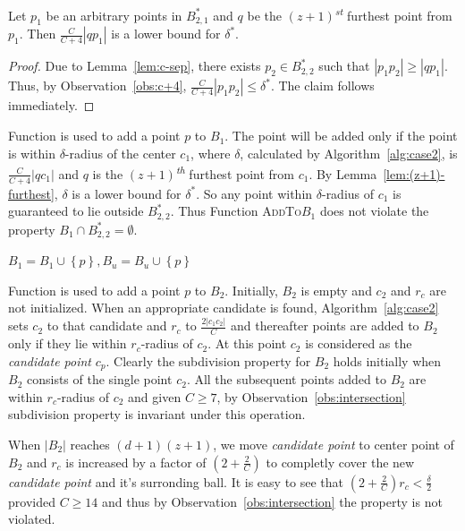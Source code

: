 \documentclass[envcountsame]{cls/cccg15}
\newcommand{\st}{\textsuperscript{\textit{st}} }
\newcommand{\nth}{\textsuperscript{\textit{th}} }
\newcommand{\set}[1]{\left\{ #1 \right\}}
\newcommand{\card}[1]{\left|{#1}\right|}
\newcommand{\lee}{\leqslant}
\newcommand{\gee}{\geqslant}
\renewcommand{\le}{\lee}
\renewcommand{\ge}{\gee}
\begin{document}
\begin{lemma}
\label{lem:(z+1)-furthest}
Let $p_1$ be an arbitrary points in $B_{2,1}^{*}$ and $q$ be the $(z+1)$\st furthest point from $p_1$. Then $\frac{C}{C+4}\card{qp_1}$ is a lower bound for $\delta^*$.
\end{lemma}
\begin{proof}
Due to Lemma~\ref{lem:c-sep}, there exists $p_2 \in B_{2,2}^*$ such that $\card{p_1p_2} \ge \card{qp_1}$. Thus, by Observation~\ref{obs:c+4}, $\frac{C}{C+4} \card{p_1p_2} \le \delta^*$. The claim follows immediately.
\end{proof}

Function  is used to add a point $p$ to $B_1$. The point will be added only if the point is within $\delta$-radius of the center $c_1$, where $\delta$, calculated by Algorithm~\ref{alg:case2}, is $\frac{C}{C+4}\card{qc_1}$ and $q$ is the $(z+1)$\nth furthest point from $c_1$. By Lemma~\ref{lem:(z+1)-furthest}, $\delta$ is a lower bound for $\delta^*$. So any point within $\delta$-radius of $c_1$ is guaranteed to lie outside $B_{2,2}^*$. Thus Function \textsc{AddTo$B_1$} does not violate the property $B_1 \cap B_{2,2}^* = \emptyset$.
\begin{algorithmic}
		\State $B_1 = B_1 \cup \set{p}, B_u = B_u \cup \set{p}$
		\State {}
	\Else
		\State {}
	\EndIf
\EndFunction
\end{algorithmic}

Function  is used to add a point $p$ to $B_2$. Initially, $B_2$ is empty and $c_2$ and $r_c$ are not initialized. When an appropriate candidate is found, Algorithm~\ref{alg:case2} sets $c_2$ to that candidate and $r_c$ to $\frac{2\card{c_1c_2}}{C}$ and thereafter
points are added to $B_2$ only if they lie within $r_c$-radius of $c_2$. At this point $c_2$ is considered as the \emph{candidate point} $c_p$. Clearly the subdivision property for $B_2$ holds initially when $B_2$ consists of the single point $c_2$. All the subsequent points added to $B_2$ are within $r_c$-radius of $c_2$ and given $C\ge 7$, by Observation~\ref{obs:intersection} subdivision property is invariant under this operation.

When $\card{B_2}$ reaches $(d+1)(z+1)$, we move \emph{candidate point} to center point of $B_2$ and $r_c$ is increased by a factor of $(2 + \frac{2}{C})$ to completly cover the new \emph{candidate point} and it's surronding ball. It is easy to see that $(2 + \frac{2}{C})r_c < \frac{\delta}{2}$ provided $C \ge 14$ and thus by Observation~\ref{obs:intersection} the property is not violated.
\end{document}

